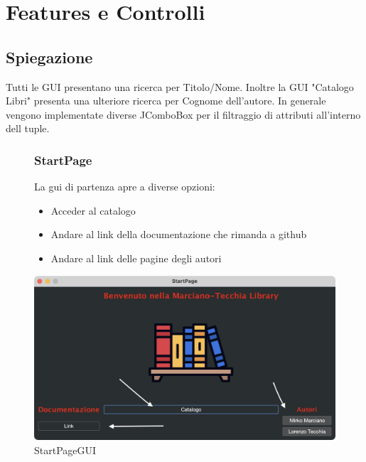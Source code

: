 \chapter{Features e Controlli}
\section{Spiegazione}
Tutti le GUI presentano una ricerca per Titolo/Nome. Inoltre la GUI "Catalogo Libri" presenta una ulteriore ricerca per Cognome dell'autore. In generale vengono implementate diverse JComboBox per il filtraggio di attributi all'interno dell tuple.

\begin{figure}[hbt]
\subsection{StartPage}
La gui di partenza apre a diverse opzioni: \begin{itemize}
	\item Acceder al catalogo
	\item Andare al link della documentazione che rimanda a github
	\item Andare al link delle pagine degli autori
\end{itemize}
\begin{center}
	\includegraphics[width=\textwidth]{Immagini/startpageScreen.png}
  \caption{StartPageGUI}
\end{center}
  
\end{figure}


